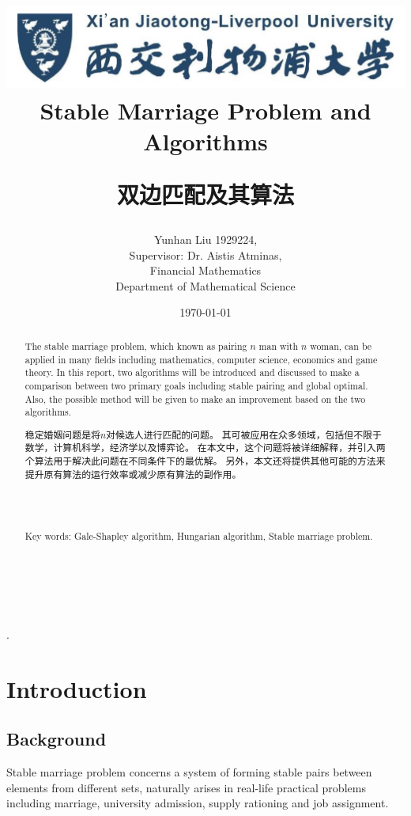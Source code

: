 \documentclass[14pt]{extarticle}
\title{\includegraphics{XJTLULOGO.png} \\ \vspace{20mm} Stable Marriage Problem and Algorithms\\ \vspace{10mm}
\begin{CJK*}{UTF8}{gbsn}
双边匹配及其算法
\end{CJK*}
\vspace{20mm}}
\date{\today}
\author{Yunhan Liu 1929224,
\\ Supervisor: Dr. Aistis Atminas, \vspace{20mm}
\\Financial Mathematics
\\Department of Mathematical Science \vspace{20mm} }
\begin{document}
\maketitle

\newpage 
.
\newpage

\begin{abstract}
  The stable marriage problem, which known as pairing $n$ man with $n$ woman, can be applied in many fields including mathematics, computer science, economics and game theory.
  In this report, two algorithms will be introduced and discussed to make a comparison between two primary goals including stable pairing and global optimal. 
  Also, the possible method will be given to make an improvement based on the two algorithms.
  \\
  \begin{CJK*}{UTF8}{gbsn}
    稳定婚姻问题是将$n$对候选人进行匹配的问题。
    其可被应用在众多领域，包括但不限于数学，计算机科学，经济学以及博弈论。
    在本文中，这个问题将被详细解释，并引入两个算法用于解决此问题在不同条件下的最优解。
    另外，本文还将提供其他可能的方法来提升原有算法的运行效率或减少原有算法的副作用。
  \end{CJK*}
  \\
  \\
  \\
  Key words: Gale-Shapley algorithm, Hungarian algorithm, Stable marriage problem.
  \\
  \\
  \\
  \\
\end{abstract}  

\newpage

\tableofcontents

\newpage


\section{Introduction}

\subsection{Background}
Stable marriage problem concerns a system of forming stable pairs between elements from different sets, 
naturally arises in real-life practical problems including marriage, university admission, supply rationing and job assignment. 
\end{document}
